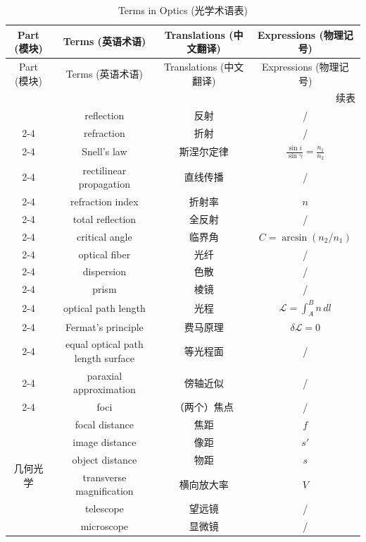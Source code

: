 \documentclass{article}
\begin{document}
  \begin{longtable}{|c|c|c|c|}
    \caption{Terms in Optics (光学术语表)} \label{Tab.2} \\
    \hline
    Part (模块) & Terms (英语术语) & Translations (中文翻译) & Expressions (物理记号) \\ 
    \hline
    \endfirsthead

    \hline
    Part (模块) & Terms (英语术语) & Translations (中文翻译) & Expressions (物理记号) \\ 
    \hline
    \endhead

    \hline
    \multicolumn{4}{r}{续表} \\
    \endfoot

    \hline
    \endlastfoot

    \multirow{15}{*}{几何光学}
    & reflection & 反射 & / \\
    \cline{2-4} 
    & refraction & 折射 & / \\
    \cline{2-4}
    & Snell's law & 斯涅尔定律 & $\frac{\sin{i}}{\sin{\gamma}}=\frac{n_1}{n_2}$ \\
    \cline{2-4}
    & rectilinear propagation & 直线传播 & / \\
    \cline{2-4}
    & refraction index & 折射率 & $n$ \\
    \cline{2-4}
    & total reflection & 全反射 & / \\
    \cline{2-4}
    & critical angle & 临界角 & $C=\arcsin{(n_2/n_1)}$ \\
    \cline{2-4}
    & optical fiber & 光纤 & / \\
    \cline{2-4}
    & dispersion & 色散 & / \\
    \cline{2-4}
    & prism & 棱镜 & / \\
    \cline{2-4}
    & optical path length & 光程 & $\mathcal{L}=\int_{A}^{B}n\,dl$ \\
    \cline{2-4}
    & Fermat's principle & 费马原理 & $\delta \mathcal{L}=0$ \\
    \cline{2-4}
    & equal optical path length surface & 等光程面 & / \\
    \cline{2-4}
    & paraxial approximation & 傍轴近似 & / \\
    \cline{2-4}
    & foci & （两个）焦点 & / \\
    \hline

    \multirow{6}{*}{几何光学}
    & focal distance & 焦距 & $f$ \\
    \cline{2-4}
    & image distance & 像距 & $s'$ \\
    \cline{2-4}
    & object distance & 物距 & $s$ \\
    \cline{2-4}
    & transverse magnification & 横向放大率 & $V$ \\
    \cline{2-4}
    & telescope & 望远镜 & / \\
    \cline{2-4}
    & microscope & 显微镜 & / \\
    \hline


\end{longtable}
\end{document}
